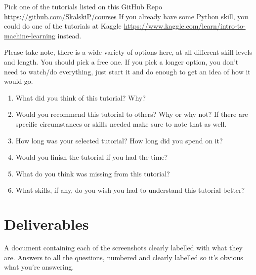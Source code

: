 \documentclass[12pt]{article}
\begin{document}
Pick one of the tutorials listed on this GitHub Repo \url{https://github.com/SkalskiP/courses}  If you already have some Python skill, you could do one of the tutorials at Kaggle \url{https://www.kaggle.com/learn/intro-to-machine-learning} instead.  

Please take note, there is a wide variety of options here, at all different skill levels and length.  You should pick a free one.  If you pick a longer option, you don't need to watch/do everything, just start it and do enough to get an idea of how it would go.


    \begin{enumerate}
        \item What did you think of this tutorial? Why?
        \item Would you recommend this tutorial to others? Why or why not? If there are specific circumstances or skills needed make sure to note that as well.
        \item How long was your selected tutorial? How long did you spend on it?
        \item Would you finish the tutorial if you had the time?
        \item What do you think was missing from this tutorial?
        \item What skills, if any, do you wish you had to understand this tutorial better?
    \end{enumerate}




\section*{Deliverables}
A document containing each of the screenshots clearly labelled with what they are.  Answers to all the questions, numbered and clearly labelled so it's obvious what you're answering.  
\end{document}
